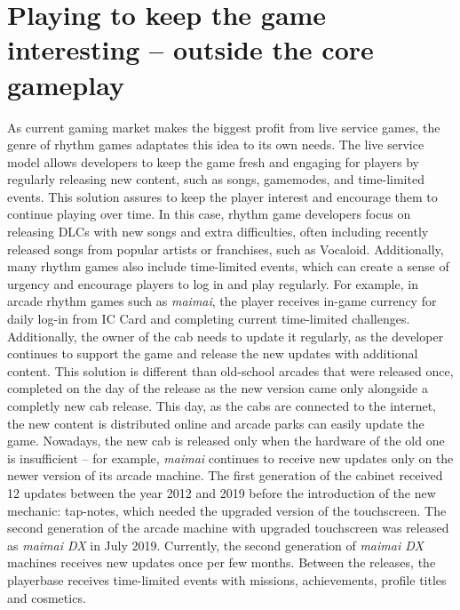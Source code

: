 \section{Playing to keep the game interesting -- outside the core gameplay}
As current gaming market makes the biggest profit from live service games, the genre of rhythm games adaptates this idea to its own needs. The live service model allows developers to keep the game fresh and engaging for players by regularly releasing new content, such as songs, gamemodes, and time-limited events. This solution assures to keep the player interest and encourage them to continue playing over time. In this case, rhythm game developers focus on releasing DLCs with new songs and extra difficulties, often including recently released songs from popular artists or franchises, such as Vocaloid. Additionally, many rhythm games also include time-limited events, which can create a sense of urgency and encourage players to log in and play regularly. For example, in arcade rhythm games such as \textit{maimai}, the player receives in-game currency for daily log-in from IC Card and completing current time-limited challenges. Additionally, the owner of the cab needs to update it regularly, as the developer continues to support the game and release the new updates with additional content. This solution is different than old-school arcades that were released once, completed on the day of the release as the new version came only alongside a completly new cab release. This day, as the cabs are connected to the internet, the new content is distributed online and arcade parks can easily update the game. Nowadays, the new cab is released only when the hardware of the old one is insufficient -- for example, \textit{maimai} continues to receive new updates only on the newer version of its arcade machine. The first generation of the cabinet received 12 updates between the year 2012 and 2019 before the introduction of the new mechanic: tap-notes, which needed the upgraded version of the touchscreen. The second generation of the arcade machine with upgraded touchscreen was released as \textit{maimai DX} in July 2019. Currently, the second generation of \textit{maimai DX} machines receives new updates once per few months. Between the releases, the playerbase receives time-limited events with missions, achievements, profile titles and cosmetics. 

